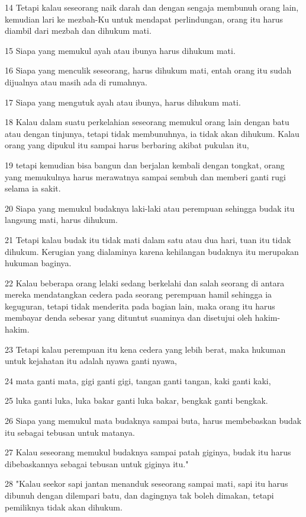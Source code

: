 \par 14 Tetapi kalau seseorang naik darah dan dengan sengaja membunuh orang lain, kemudian lari ke mezbah-Ku untuk mendapat perlindungan, orang itu harus diambil dari mezbah dan dihukum mati.
\par 15 Siapa yang memukul ayah atau ibunya harus dihukum mati.
\par 16 Siapa yang menculik seseorang, harus dihukum mati, entah orang itu sudah dijualnya atau masih ada di rumahnya.
\par 17 Siapa yang mengutuk ayah atau ibunya, harus dihukum mati.
\par 18 Kalau dalam suatu perkelahian seseorang memukul orang lain dengan batu atau dengan tinjunya, tetapi tidak membunuhnya, ia tidak akan dihukum. Kalau orang yang dipukul itu sampai harus berbaring akibat pukulan itu,
\par 19 tetapi kemudian bisa bangun dan berjalan kembali dengan tongkat, orang yang memukulnya harus merawatnya sampai sembuh dan memberi ganti rugi selama ia sakit.
\par 20 Siapa yang memukul budaknya laki-laki atau perempuan sehingga budak itu langsung mati, harus dihukum.
\par 21 Tetapi kalau budak itu tidak mati dalam satu atau dua hari, tuan itu tidak dihukum. Kerugian yang dialaminya karena kehilangan budaknya itu merupakan hukuman baginya.
\par 22 Kalau beberapa orang lelaki sedang berkelahi dan salah seorang di antara mereka mendatangkan cedera pada seorang perempuan hamil sehingga ia keguguran, tetapi tidak menderita pada bagian lain, maka orang itu harus membayar denda sebesar yang dituntut suaminya dan disetujui oleh hakim-hakim.
\par 23 Tetapi kalau perempuan itu kena cedera yang lebih berat, maka hukuman untuk kejahatan itu adalah nyawa ganti nyawa,
\par 24 mata ganti mata, gigi ganti gigi, tangan ganti tangan, kaki ganti kaki,
\par 25 luka ganti luka, luka bakar ganti luka bakar, bengkak ganti bengkak.
\par 26 Siapa yang memukul mata budaknya sampai buta, harus membebaskan budak itu sebagai tebusan untuk matanya.
\par 27 Kalau seseorang memukul budaknya sampai patah giginya, budak itu harus dibebaskannya sebagai tebusan untuk giginya itu."
\par 28 "Kalau seekor sapi jantan menanduk seseorang sampai mati, sapi itu harus dibunuh dengan dilempari batu, dan dagingnya tak boleh dimakan, tetapi pemiliknya tidak akan dihukum.
